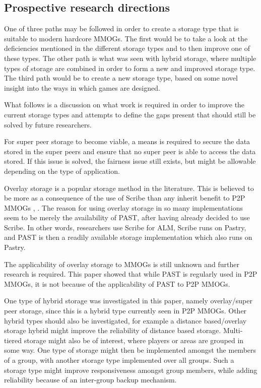 \subsection{Prospective research directions}
One of three paths may be followed in order to create a storage type that is suitable to modern hardcore MMOGs. The first would be to take a look at
the deficiencies mentioned in the different storage types and to then improve one of these types. The other path is what was seen with hybrid
storage, where multiple types of storage are combined in order to form a new and improved storage type. The third path would be to create a new
storage type, based on some novel insight into the ways in which games are designed.

What follows is a discussion on what work is required in order to improve the current storage types and attempts to define the gaps present that
should still be solved by future researchers.

For super peer storage to become viable, a means is required to secure the data stored in the super peers and ensure that no super peer is able to
access the data stored. If this issue is solved, the fairness issue still exists, but might be allowable depending on the type of application.

Overlay storage is a popular storage method in the literature. This is believed to be more as a consequence of the use of Scribe \cite{scribe} than
any inherit benefit to P2P MMOGs \cite{past_storage_focus}, \cite{Fan_phd}. The reason for using overlay storage in so many implementations seem to
be merely the availability of PAST, after having already decided to use Scribe. In other words, researchers use Scribe for ALM, Scribe runs on
Pastry, and PAST is then a readily available storage implementation which also runs on Pastry.

The applicability of overlay storage to MMOGs is still unknown and further research is required. This paper showed that while PAST is regularly used
in P2P MMOGs, it is not because of the applicability of PAST to P2P MMOGs.

One type of hybrid storage was investigated in this paper, namely overlay/super peer storage, since this is a hybrid type currently seen in P2P
MMOGs. Other hybrid types should also be investigated, for example a distance based/overlay storage hybrid might improve the reliability of distance
based storage. Multi-tiered storage might also be of interest, where players or areas are grouped in some way. One type of storage might then be
implemented amongst the members of a group, with another storage type implemented over all groups. Such a storage type might improve responsiveness
amongst group members, while adding reliability because of an inter-group backup mechanism.

